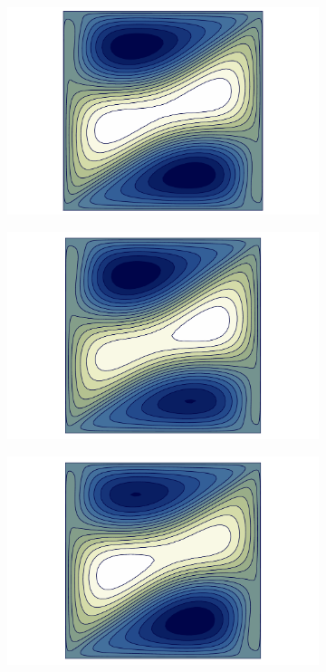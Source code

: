 \begin{figure}[h!]
\centering
\begin{subfigure}[b]{0.3\textwidth}
  \centering
  \includegraphics[trim={2cm 0 2cm 0},clip,width=\textwidth]{figs/psi_Re353.356_pf3.pdf}
\end{subfigure}
\begin{subfigure}[b]{0.3\textwidth}
  \centering
  \includegraphics[trim={2cm 0 2cm 0},clip,width=\textwidth]{figs/psi_Re375.000_branch2_u_t_smaller.pdf}
\end{subfigure}
\begin{subfigure}[b]{0.3\textwidth}
  \centering
  \includegraphics[trim={2cm 0 2cm 0},clip,width=\textwidth]{figs/psi_Re375.000_branch2_u_t_bigger.pdf}

\end{subfigure}
\end{figure}
